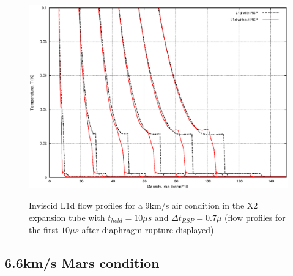 \documentclass[a4paper,10pt]{article}
\begin{document}
\begin{figure}[h]
\begin{center}
{{         \includegraphics[scale=0.45]{figs/air_iv_density_profile.eps}
      } \quad
      }
    \caption{Inviscid L1d flow profiles for a 9km/s air condition in the X2 expansion tube with $t_{hold} = 10 \mu s$ and $\Delta t_{RSP} = 0.7 \mu $ (flow profiles for the first $10 \mu s$ after diaphragm rupture displayed)}
    \label{fig:mars_profiles}
  \end{center}
\end{figure}

\newpage

\subsection{6.6km/s Mars condition}
\end{document}
